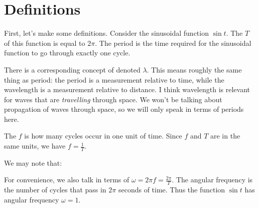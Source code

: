 \section{Definitions}

First, let's make some definitions. Consider the sinusoidal function
$\sin t$. The  $T$ of this function is equal to $2\pi$.
The period is the time required for the sinusoidal function to go
through exactly one cycle.

There is a corresponding concept of  denoted
$\lambda$. This means roughly the same thing as period: the period is a
measurement relative to time, while the wavelength is a measurement
relative to distance. I think wavelength is relevant for waves that are
\emph{travelling} through space. We won't be talking about propagation
of waves through space, so we will only speak in terms of periods here.

The  $f$ is how many cycles occur in one unit of time.
Since $f$ and $T$ are in the same units, we have $f = \frac{1}{T}$.

We may note that:

\begin{nedqn}
  \sin{}
\eqcol
  \sin{}
\end{nedqn}

For convenience, we also talk in terms of 
$\omega = 2\pi f = \frac{2\pi}{T}$. The angular frequency is the number
of cycles that pass in $2\pi$ seconds of time. Thus the function $\sin
t$ has angular frequency $\omega = 1$.

